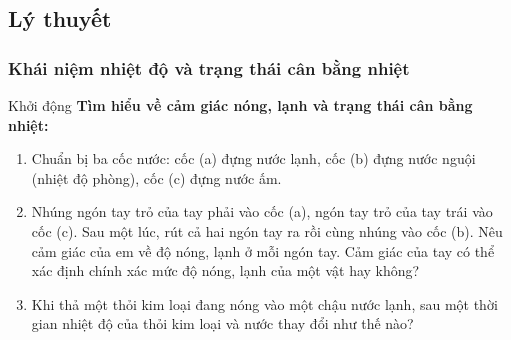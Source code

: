 


\subsection{Lý thuyết}

\subsubsection{Khái niệm nhiệt độ và trạng thái cân bằng nhiệt}

\begin{hoatdong}{Khởi động}
	\textbf{Tìm hiểu về cảm giác nóng, lạnh và trạng thái cân bằng nhiệt:}
	\begin{enumerate}
		\item Chuẩn bị ba cốc nước: cốc (a) đựng nước lạnh, cốc (b) đựng nước nguội (nhiệt độ phòng), cốc (c) đựng nước ấm.
		\item Nhúng ngón tay trỏ của tay phải vào cốc (a), ngón tay trỏ của tay trái vào cốc (c). Sau một lúc, rút cả hai ngón tay ra rồi cùng nhúng vào cốc (b). Nêu cảm giác của em về độ nóng, lạnh ở mỗi ngón tay. Cảm giác của tay có thể xác định chính xác mức độ nóng, lạnh của một vật hay không?
		\item Khi thả một thỏi kim loại đang nóng vào một chậu nước lạnh, sau một thời gian nhiệt độ của thỏi kim loại và nước thay đổi như thế nào?
	\end{enumerate}
\end{hoatdong}

